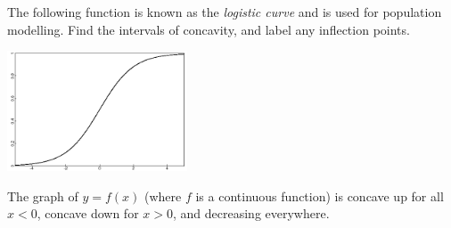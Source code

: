 \begin{questions}
  \questioA The following function is known as the \textit{logistic curve} and is used for population modelling. Find the intervals of
            concavity, and label any inflection points.
            \begin{center}
              \includegraphics[width=0.4\textwidth]{logistic}
            \end{center}
  \questioM The graph of $ y = f(x) $ (where $ f $ is a continuous function) is concave up for all $ x < 0 $, concave down for $ x > 0 $, and decreasing everywhere.
\end{questions}
